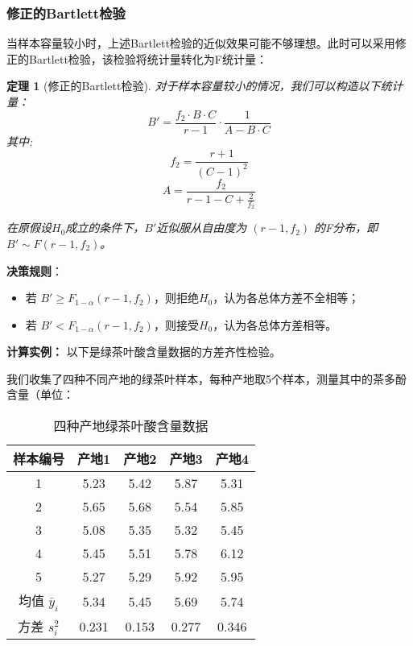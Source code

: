 \documentclass[12pt, a4paper]{amsart}
\newtheorem{theorem}{定理}
\begin{document}
\subsubsection{修正的Bartlett检验}
当样本容量较小时，上述Bartlett检验的近似效果可能不够理想。此时可以采用修正的Bartlett检验，该检验将统计量转化为F统计量：

\begin{theorem}[修正的Bartlett检验]
对于样本容量较小的情况，我们可以构造以下统计量：
\begin{equation}
B' = \frac{f_2 \cdot B \cdot C}{r-1}\cdot\frac{1}{A - B \cdot C}
\end{equation}
其中:
\begin{equation}
f_2 = \frac{r+1}{(C-1)^2}
\end{equation}
\begin{equation}
A = \frac{f_2}{r-1-C+\frac{2}{f_2}}
\end{equation}

在原假设$H_0$成立的条件下，$B'$近似服从自由度为 $(r-1, f_2)$ 的F分布，即 $B' \sim F(r-1, f_2)$。
\end{theorem}

\textbf{决策规则}：
\begin{itemize}
    \item 若 $B' \geq F_{1-\alpha}(r-1, f_2)$，则拒绝$H_0$，认为各总体方差不全相等；
    \item 若 $B' < F_{1-\alpha}(r-1, f_2)$，则接受$H_0$，认为各总体方差相等。
\end{itemize}

\textbf{计算实例：} 以下是绿茶叶酸含量数据的方差齐性检验。

我们收集了四种不同产地的绿茶叶样本，每种产地取5个样本，测量其中的茶多酚含量（单位：%

\begin{table}[h!]
\centering
\caption{四种产地绿茶叶酸含量数据}
\begin{tabular}{ccccc}
\toprule
\textbf{样本编号} & \textbf{产地1} & \textbf{产地2} & \textbf{产地3} & \textbf{产地4} \\
\midrule
1 & 5.23 & 5.42 & 5.87 & 5.31 \\
2 & 5.65 & 5.68 & 5.54 & 5.85 \\
3 & 5.08 & 5.35 & 5.32 & 5.45 \\
4 & 5.45 & 5.51 & 5.78 & 6.12 \\
5 & 5.27 & 5.29 & 5.92 & 5.95 \\
\midrule
均值 $\bar{y}_i$ & 5.34 & 5.45 & 5.69 & 5.74 \\
方差 $s_i^2$ & 0.231 & 0.153 & 0.277 & 0.346 \\
\bottomrule
\end{tabular}
\end{table}
\end{document}
